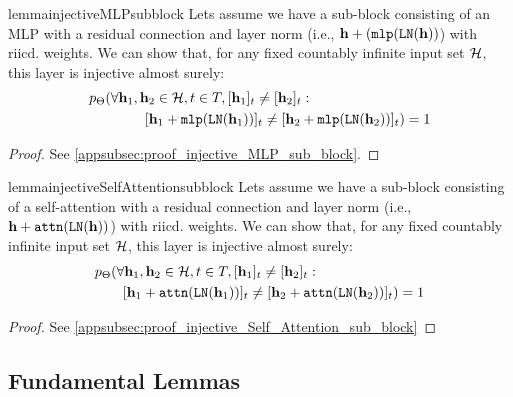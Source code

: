 \begin{restatable}{lemma}{injectiveMLPsubblock}\label{theorem:injective_MLP_sub_block}
    Lets assume we have a sub-block consisting of an MLP with a residual connection and layer norm  (i.e., $\mathbf{h}+(\mathtt{mlp}(\mathtt{LN}(\mathbf{h}))$) with riicd. weights.
    We can show that, for any fixed countably infinite input set $\mathcal{H}$, this layer is injective almost surely:
    \begin{align} \label{eq:injective_MLP_sub_block}
        &p_{\Theta}(\forall \mathbf{h}_1,\mathbf{h}_2\in \mathcal{H},t\in T,[\mathbf{h}_1]_t\neq[\mathbf{h}_2]_t: \\
        &\qquad\qquad  [\mathbf{h}_1+\mathtt{mlp}(\mathtt{LN}(\mathbf{h}_1))]_t\neq[\mathbf{h}_2+\mathtt{mlp}(\mathtt{LN}(\mathbf{h}_2))]_t)=1 \nonumber
    \end{align}
\end{restatable}
\begin{proof}
    See \cref{appsubsec:proof_injective_MLP_sub_block}.
\end{proof}

\begin{restatable}{lemma}{injectiveSelfAttentionsubblock}\label{theorem:injective_Self_Attention_sub_block}
    Lets assume we have a sub-block consisting of a self-attention with a residual connection and layer norm  (i.e., $\mathbf{h}+\mathtt{attn}(\mathtt{LN}(\mathbf{h}))$) with riicd. weights. We can show that, for any fixed countably infinite input set $\mathcal{H}$, this layer is injective almost surely:
    \begin{align} \label{eq:injective_Self_Attention_sub_block}
        &p_{\Theta}(\forall \mathbf{h}_1,\mathbf{h}_2\in \mathcal{H},t\in T,[\mathbf{h}_1]_t\neq[\mathbf{h}_2]_t: \\
        &\qquad [\mathbf{h}_1+\mathtt{attn}(\mathtt{LN}(\mathbf{h}_1))]_t\neq[\mathbf{h}_2+\mathtt{attn}(\mathtt{LN}(\mathbf{h}_2))]_t)=1 \nonumber
    \end{align}
\end{restatable}
\begin{proof}
    See \cref{appsubsec:proof_injective_Self_Attention_sub_block}
\end{proof}

\subsection{Fundamental Lemmas}\label{appsubsec:Fundamental_Theorems_inject_transformer}

